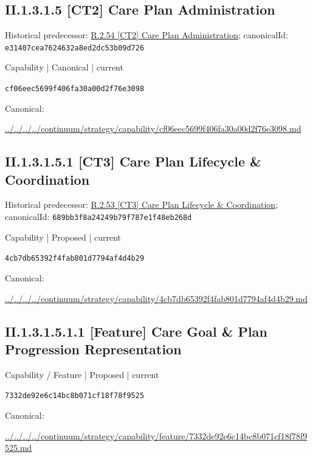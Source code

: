 \documentclass[10pt,a4paper]{article}
\begin{document}
\subsection*{II.1.3.1.5 [CT2] Care Plan Administration}
Historical predecessor: \hyperref[element-e31407cea7624632a8ed2dc53b09d726]{R.2.54 [CT2] Care Plan Administration}; canonicalId: \texttt{e31407cea7624632a8ed2dc53b09d726}\par
\label{element-cf06eec5699f406fa30a00d2f76e3098}
{\small Capability | Canonical | current}\par
\texttt{cf06eec5699f406fa30a00d2f76e3098}\par
Canonical: \par
{\footnotesize\url{../../../../continuum/strategy/capability/cf06eec5699f406fa30a00d2f76e3098.md}}\par
\subsection*{II.1.3.1.5.1 [CT3] Care Plan Lifecycle \& Coordination}
Historical predecessor: \hyperref[element-689bb3f8a24249b79f787e1f48eb268d]{R.2.53 [CT3] Care Plan Lifecycle \& Coordination}; canonicalId: \texttt{689bb3f8a24249b79f787e1f48eb268d}\par
\label{element-4cb7db65392f4fab801d7794af4d4b29}
{\small Capability | Proposed | current}\par
\texttt{4cb7db65392f4fab801d7794af4d4b29}\par
Canonical: \par
{\footnotesize\url{../../../../continuum/strategy/capability/4cb7db65392f4fab801d7794af4d4b29.md}}\par
\subsection*{II.1.3.1.5.1.1 [Feature] Care Goal \& Plan Progression Representation}
\label{element-7332de92e6c14bc8b071cf18f78f9525}
{\small Capability / Feature | Proposed | current}\par
\texttt{7332de92e6c14bc8b071cf18f78f9525}\par
Canonical: \par
{\footnotesize\url{../../../../continuum/strategy/capability/feature/7332de92e6c14bc8b071cf18f78f9525.md}}\par
\end{document}
